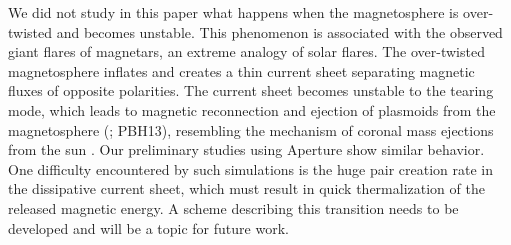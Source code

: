 We did not study in this paper what happens when the magnetosphere is
over-twisted and becomes unstable. This phenomenon is associated with the
observed giant flares of magnetars, an extreme analogy of solar flares. The
over-twisted magnetosphere inflates and creates a thin current sheet separating
magnetic fluxes of opposite polarities. The current sheet becomes
unstable to the tearing mode, which leads to magnetic reconnection and ejection
of plasmoids from the magnetosphere (\citealp{2003MNRAS.346..540L}; PBH13), resembling the
mechanism of coronal mass ejections from the sun
\cite[e.g.][]{1994ApJ...430..898M}.
Our preliminary studies using Aperture show similar behavior.
One difficulty encountered by such simulations is the huge pair creation rate
in the dissipative current sheet, which must result in quick thermalization
of the released magnetic energy. A scheme describing this transition needs to
be developed and will be a topic for future work.

